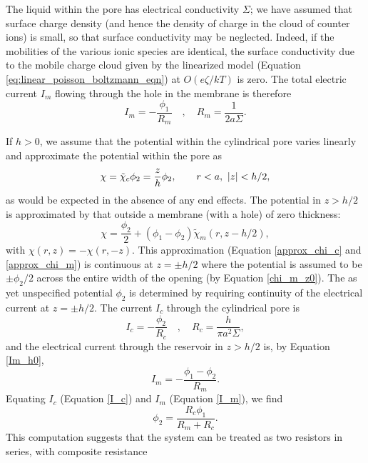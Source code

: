 The liquid within the pore has electrical conductivity $\Sigma$; we have assumed that surface charge density (and hence the density of charge in the cloud of counter ions) is small, so that surface conductivity may be neglected. Indeed, if the mobilities of the various ionic species are identical, the surface conductivity due to the mobile charge cloud given by the linearized model (Equation \ref{eq:linear_poisson_boltzmann_eqn}) at $O(e\zeta/kT)$ is zero. The total electric current $I_m$ flowing through the hole in the membrane is therefore
\begin{equation}
I_m=-\frac{\phi_1}{R_m}\quad,\quad R_m=\frac{1}{2a\Sigma}.
\label{Im_h0}
\end{equation}

If $h>0$, we assume that the potential within the cylindrical pore varies linearly and approximate the potential within the pore as
\begin{equation}
\chi=\tilde\chi_c\phi_2=\frac{z}{h}\phi_2,\hskip 20pt r<a,\ |z|<h/2,
\label{approx_chi_c}
\end{equation}
as would be expected in the absence of any end effects. The potential in $z>h/2$ is approximated by that outside a membrane (with a hole) of zero thickness:
\begin{equation}
\chi=\frac{\phi_2}{2}+(\phi_1-\phi_2)\tilde\chi_m(r,z-h/2),
\label{approx_chi_m}
\end{equation}
with $\chi(r,z)=-\chi(r,-z)$. This approximation (Equation \ref{approx_chi_c} and \ref{approx_chi_m}) is continuous at $z=\pm h/2$ where the potential is assumed to be $\pm \phi_2/2$ across the entire width of the opening (by Equation \ref{chi_m_z0}). The as yet unspecified
potential $\phi_2$ is determined by requiring continuity of the electrical current at $z=\pm h/2$. The current $I_c$ through the cylindrical pore is
\begin{equation}
I_c=-\frac{\phi_2}{R_c}\quad,\quad R_c=\frac{h}{\pi a^2\Sigma},
\label{I_c}
\end{equation}
and the electrical current through the reservoir in $z>h/2$ is, by Equation \ref{Im_h0},
\begin{equation}
I_m=- \frac{\phi_1-\phi_2}{R_m}.
\label{I_m}
\end{equation}
Equating $I_c$ (Equation \ref{I_c}) and  $I_m$ (Equation \ref{I_m}), we find
\begin{equation}
\phi_2=\frac{R_c\phi_1}{R_m+R_c}.
\label{phi_2}
\end{equation}
This computation suggests that the system can be treated as two resistors in series, with composite resistance
